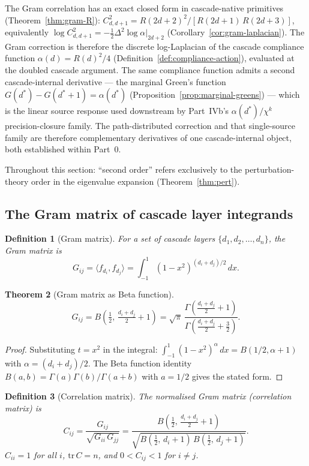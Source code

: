 \documentclass[11pt,a4paper]{article}
\newtheorem{theorem}{Theorem}[section]
\newtheorem{definition}[theorem]{Definition}
\begin{document}
The Gram correlation has an exact closed form in cascade-native primitives (Theorem~\ref{thm:gram-R}): $C^2_{d,d+1} = R(2d+2)^2 / [R(2d+1)\,R(2d+3)]$, equivalently $\log C^2_{d,d+1} = -\tfrac{1}{2}\Delta^2 \log\alpha\big|_{2d+2}$ (Corollary~\ref{cor:gram-laplacian}). The Gram correction is therefore the discrete log-Laplacian of the cascade compliance function $\alpha(d) = R(d)^2/4$ (Definition~\ref{def:compliance-action}), evaluated at the doubled cascade argument. The same compliance function admits a second cascade-internal derivative --- the marginal Green's function $G(d^*) - G(d^*+1) = \alpha(d^*)$ (Proposition~\ref{prop:marginal-greens}) --- which is the linear source response used downstream by Part~IVb's $\alpha(d^*)/\chi^k$ precision-closure family. The path-distributed correction and that single-source family are therefore complementary derivatives of one cascade-internal object, both established within Part~0.

Throughout this section: ``second order'' refers exclusively to the perturbation-theory order in the eigenvalue expansion (Theorem~\ref{thm:pert}).

\subsection{The Gram matrix of cascade layer integrands}

\begin{definition}[Gram matrix]
For a set of cascade layers $\{d_1, d_2, \ldots, d_n\}$, the Gram matrix is
\[
G_{ij} = \langle f_{d_i}, f_{d_j} \rangle = \int_{-1}^{1} (1 - x^2)^{(d_i + d_j)/2}\, dx.
\]
\end{definition}

\begin{theorem}[Gram matrix as Beta function]\label{thm:gram}
\[
G_{ij} = B\!\left(\tfrac{1}{2},\, \tfrac{d_i + d_j}{2} + 1\right) = \sqrt{\pi}\, \frac{\Gamma\!\left(\frac{d_i + d_j}{2} + 1\right)}{\Gamma\!\left(\frac{d_i + d_j}{2} + \frac{3}{2}\right)}.
\]
\end{theorem}

\begin{proof}
Substituting $t = x^2$ in the integral: $\int_{-1}^{1}(1 - x^2)^\alpha\, dx = B(1/2, \alpha + 1)$ with $\alpha = (d_i + d_j)/2$. The Beta function identity $B(a,b) = \Gamma(a)\Gamma(b)/\Gamma(a+b)$ with $a = 1/2$ gives the stated form.
\end{proof}

\begin{definition}[Correlation matrix]
The normalised Gram matrix (correlation matrix) is
\[
C_{ij} = \frac{G_{ij}}{\sqrt{G_{ii}\, G_{jj}}} = \frac{B\!\left(\frac{1}{2},\, \frac{d_i + d_j}{2} + 1\right)}{\sqrt{B\!\left(\frac{1}{2},\, d_i + 1\right)\, B\!\left(\frac{1}{2},\, d_j + 1\right)}}.
\]
$C_{ii} = 1$ for all $i$, $\mathrm{tr}\, C = n$, and $0 < C_{ij} < 1$ for $i \neq j$.
\end{definition}
\end{document}
